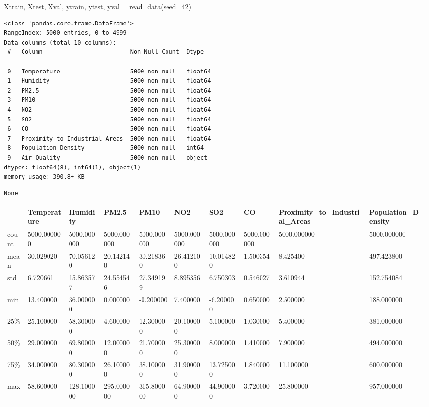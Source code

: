 \documentclass[
  letterpaper,
  DIV=11,
  numbers=noendperiod]{scrartcl}
\newenvironment{Shaded}{\begin{snugshade}}{\end{snugshade}}
\newcommand{\DecValTok}[1]{\textcolor[rgb]{0.68,0.00,0.00}{#1}}
\newcommand{\NormalTok}[1]{\textcolor[rgb]{0.00,0.23,0.31}{#1}}
\newcommand{\OperatorTok}[1]{\textcolor[rgb]{0.37,0.37,0.37}{#1}}
\begin{document}
\begin{Shaded}
\begin{Highlighting}[]
\NormalTok{Xtrain, Xtest, Xval, ytrain, ytest, yval }\OperatorTok{=}\NormalTok{ read\_data(seed}\OperatorTok{=}\DecValTok{42}\NormalTok{)}
\end{Highlighting}
\end{Shaded}

\begin{verbatim}
<class 'pandas.core.frame.DataFrame'>
RangeIndex: 5000 entries, 0 to 4999
Data columns (total 10 columns):
 #   Column                         Non-Null Count  Dtype  
---  ------                         --------------  -----  
 0   Temperature                    5000 non-null   float64
 1   Humidity                       5000 non-null   float64
 2   PM2.5                          5000 non-null   float64
 3   PM10                           5000 non-null   float64
 4   NO2                            5000 non-null   float64
 5   SO2                            5000 non-null   float64
 6   CO                             5000 non-null   float64
 7   Proximity_to_Industrial_Areas  5000 non-null   float64
 8   Population_Density             5000 non-null   int64  
 9   Air Quality                    5000 non-null   object 
dtypes: float64(8), int64(1), object(1)
memory usage: 390.8+ KB
\end{verbatim}

\begin{verbatim}
None
\end{verbatim}

\begin{longtable}[]{@{}llllllllll@{}}
\toprule\noalign{}
& Temperature & Humidity & PM2.5 & PM10 & NO2 & SO2 & CO &
Proximity\_to\_Industrial\_Areas & Population\_Density \\
\midrule\noalign{}
\endhead
\bottomrule\noalign{}
\endlastfoot
count & 5000.000000 & 5000.000000 & 5000.000000 & 5000.000000 &
5000.000000 & 5000.000000 & 5000.000000 & 5000.000000 & 5000.000000 \\
mean & 30.029020 & 70.056120 & 20.142140 & 30.218360 & 26.412100 &
10.014820 & 1.500354 & 8.425400 & 497.423800 \\
std & 6.720661 & 15.863577 & 24.554546 & 27.349199 & 8.895356 & 6.750303
& 0.546027 & 3.610944 & 152.754084 \\
min & 13.400000 & 36.000000 & 0.000000 & -0.200000 & 7.400000 &
-6.200000 & 0.650000 & 2.500000 & 188.000000 \\
25\% & 25.100000 & 58.300000 & 4.600000 & 12.300000 & 20.100000 &
5.100000 & 1.030000 & 5.400000 & 381.000000 \\
50\% & 29.000000 & 69.800000 & 12.000000 & 21.700000 & 25.300000 &
8.000000 & 1.410000 & 7.900000 & 494.000000 \\
75\% & 34.000000 & 80.300000 & 26.100000 & 38.100000 & 31.900000 &
13.725000 & 1.840000 & 11.100000 & 600.000000 \\
max & 58.600000 & 128.100000 & 295.000000 & 315.800000 & 64.900000 &
44.900000 & 3.720000 & 25.800000 & 957.000000 \\
\end{longtable}
\end{document}
